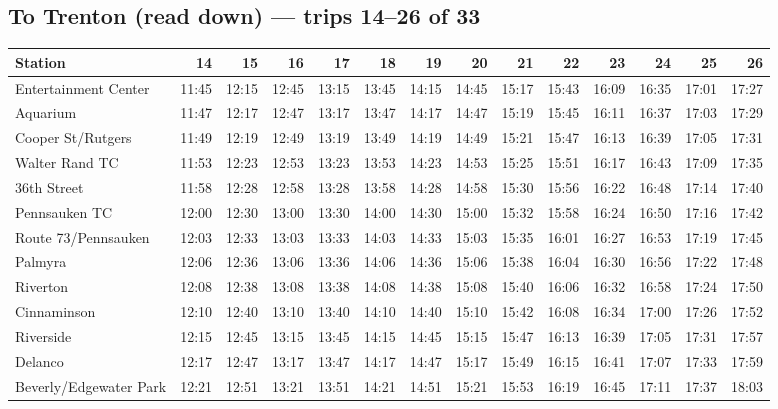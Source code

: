 \subsection*{To Trenton (read down) --- trips 14--26 of 33}
\begin{center}\footnotesize\setlength{\tabcolsep}{3pt}\begin{tabular}{@{}lrrrrrrrrrrrrr@{}}\toprule
Station & 14 & 15 & 16 & 17 & 18 & 19 & 20 & 21 & 22 & 23 & 24 & 25 & 26 \\\midrule
Entertainment Center & 11:45 & 12:15 & 12:45 & 13:15 & 13:45 & 14:15 & 14:45 & 15:17 & 15:43 & 16:09 & 16:35 & 17:01 & 17:27 \\
Aquarium & 11:47 & 12:17 & 12:47 & 13:17 & 13:47 & 14:17 & 14:47 & 15:19 & 15:45 & 16:11 & 16:37 & 17:03 & 17:29 \\
Cooper St/Rutgers & 11:49 & 12:19 & 12:49 & 13:19 & 13:49 & 14:19 & 14:49 & 15:21 & 15:47 & 16:13 & 16:39 & 17:05 & 17:31 \\
Walter Rand TC & 11:53 & 12:23 & 12:53 & 13:23 & 13:53 & 14:23 & 14:53 & 15:25 & 15:51 & 16:17 & 16:43 & 17:09 & 17:35 \\
36th Street & 11:58 & 12:28 & 12:58 & 13:28 & 13:58 & 14:28 & 14:58 & 15:30 & 15:56 & 16:22 & 16:48 & 17:14 & 17:40 \\
Pennsauken TC & 12:00 & 12:30 & 13:00 & 13:30 & 14:00 & 14:30 & 15:00 & 15:32 & 15:58 & 16:24 & 16:50 & 17:16 & 17:42 \\
Route 73/Pennsauken & 12:03 & 12:33 & 13:03 & 13:33 & 14:03 & 14:33 & 15:03 & 15:35 & 16:01 & 16:27 & 16:53 & 17:19 & 17:45 \\
Palmyra & 12:06 & 12:36 & 13:06 & 13:36 & 14:06 & 14:36 & 15:06 & 15:38 & 16:04 & 16:30 & 16:56 & 17:22 & 17:48 \\
Riverton & 12:08 & 12:38 & 13:08 & 13:38 & 14:08 & 14:38 & 15:08 & 15:40 & 16:06 & 16:32 & 16:58 & 17:24 & 17:50 \\
Cinnaminson & 12:10 & 12:40 & 13:10 & 13:40 & 14:10 & 14:40 & 15:10 & 15:42 & 16:08 & 16:34 & 17:00 & 17:26 & 17:52 \\
Riverside & 12:15 & 12:45 & 13:15 & 13:45 & 14:15 & 14:45 & 15:15 & 15:47 & 16:13 & 16:39 & 17:05 & 17:31 & 17:57 \\
Delanco & 12:17 & 12:47 & 13:17 & 13:47 & 14:17 & 14:47 & 15:17 & 15:49 & 16:15 & 16:41 & 17:07 & 17:33 & 17:59 \\
Beverly/Edgewater Park & 12:21 & 12:51 & 13:21 & 13:51 & 14:21 & 14:51 & 15:21 & 15:53 & 16:19 & 16:45 & 17:11 & 17:37 & 18:03 \\

\end{tabular}
\end{center}
